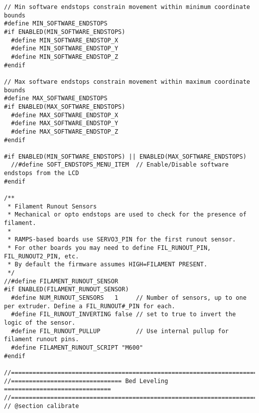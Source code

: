 \begin{lstlisting}
// Min software endstops constrain movement within minimum coordinate bounds
#define MIN_SOFTWARE_ENDSTOPS
#if ENABLED(MIN_SOFTWARE_ENDSTOPS)
  #define MIN_SOFTWARE_ENDSTOP_X
  #define MIN_SOFTWARE_ENDSTOP_Y
  #define MIN_SOFTWARE_ENDSTOP_Z
#endif

// Max software endstops constrain movement within maximum coordinate bounds
#define MAX_SOFTWARE_ENDSTOPS
#if ENABLED(MAX_SOFTWARE_ENDSTOPS)
  #define MAX_SOFTWARE_ENDSTOP_X
  #define MAX_SOFTWARE_ENDSTOP_Y
  #define MAX_SOFTWARE_ENDSTOP_Z
#endif

#if ENABLED(MIN_SOFTWARE_ENDSTOPS) || ENABLED(MAX_SOFTWARE_ENDSTOPS)
  //#define SOFT_ENDSTOPS_MENU_ITEM  // Enable/Disable software endstops from the LCD
#endif

/**
 * Filament Runout Sensors
 * Mechanical or opto endstops are used to check for the presence of filament.
 *
 * RAMPS-based boards use SERVO3_PIN for the first runout sensor.
 * For other boards you may need to define FIL_RUNOUT_PIN, FIL_RUNOUT2_PIN, etc.
 * By default the firmware assumes HIGH=FILAMENT PRESENT.
 */
//#define FILAMENT_RUNOUT_SENSOR
#if ENABLED(FILAMENT_RUNOUT_SENSOR)
  #define NUM_RUNOUT_SENSORS   1     // Number of sensors, up to one per extruder. Define a FIL_RUNOUT#_PIN for each.
  #define FIL_RUNOUT_INVERTING false // set to true to invert the logic of the sensor.
  #define FIL_RUNOUT_PULLUP          // Use internal pullup for filament runout pins.
  #define FILAMENT_RUNOUT_SCRIPT "M600"
#endif

//===========================================================================
//=============================== Bed Leveling ==============================
//===========================================================================
// @section calibrate


\end{lstlisting}
